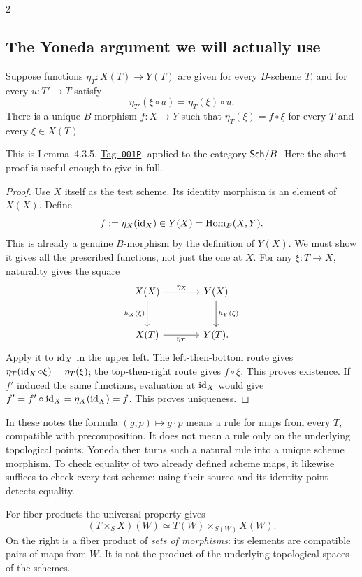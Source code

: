 \documentclass[12pt]{memoir}
\newcommand{\BGtag}[1]{\href{https://stacks.math.columbia.edu/tag/#1}{Tag~\texttt{#1}}}
\begin{document}
\begin{multicols}{2}
\subsection{The Yoneda argument we will actually use}
\begin{Th}\label{th:pointyoneda}
Suppose functions $\eta_T:X(T)\to Y(T)$ are given for every
$B$-scheme $T$, and for every $u:T'\to T$ satisfy
\[
 \eta_{T'}(\xi\circ u)=\eta_T(\xi)\circ u.
\]
There is a unique $B$-morphism $f:X\to Y$ such that
$\eta_T(\xi)=f\circ\xi$ for every $T$ and every $\xi\in X(T)$.
\end{Th}
This is Lemma~4.3.5, \BGtag{001P}, applied to the category $\mathsf{Sch}/B$.
Here the short proof is useful enough to give in full.
\begin{proof}
Use $X$ itself as the test scheme. Its identity morphism is an element
of $X(X)$. Define
\[
 f:=\eta_X(\operatorname{id}_X)\in Y(X)=\operatorname{Hom}_B(X,Y).
\]
This is already a genuine $B$-morphism by the definition of $Y(X)$.
We must show it gives all the prescribed functions, not just the one
at $X$. For any $\xi:T\to X$, naturality gives the square
\[
\begin{tikzcd}[column sep=large,row sep=large]
X(X) \arrow[r,"\eta_X"] \arrow[d,"h_X(\xi)"']
 &Y(X) \arrow[d,"h_Y(\xi)"]\\
X(T) \arrow[r,"\eta_T"'] &Y(T).
\end{tikzcd}
\]
Apply it to $\operatorname{id}_X$ in the upper left. The left-then-bottom route
gives $\eta_T(\operatorname{id}_X\circ\xi)=\eta_T(\xi)$; the
top-then-right route gives $f\circ\xi$. This proves existence.
If $f'$ induced the same functions, evaluation at $\operatorname{id}_X$ would
give $f'=f'\circ\operatorname{id}_X=\eta_X(\operatorname{id}_X)=f$. This proves uniqueness.
\end{proof}

\begin{Rmk}
In these notes the formula $(g,p)\mapsto g\cdot p$ means a rule
for maps from every $T$, compatible with precomposition. It does not
mean a rule only on the underlying topological points. Yoneda then
turns such a natural rule into a unique scheme morphism.
To check equality of two already defined scheme maps, it likewise
suffices to check every test scheme: using their source and its
identity point detects equality.

For fiber products the universal property gives
\[
 (T\times_S X)(W)\simeq T(W)\times_{S(W)}X(W).
\]
On the right is a fiber product of \emph{sets of morphisms}: its
elements are compatible pairs of maps from $W$. It is not the product
of the underlying topological spaces of the schemes.
\end{Rmk}


\end{multicols}
\end{document}

